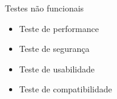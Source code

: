 \begin{frame}{Testes não funcionais}
    \begin{itemize}
        \item Teste de performance
        \item Teste de segurança
        \item Teste de usabilidade
        \item Teste de compatibilidade
    \end{itemize}
\end{frame}